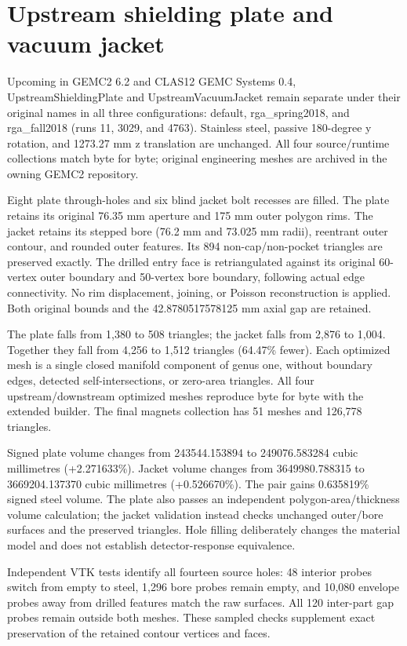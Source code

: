 \FloatBarrier
\section{Upstream shielding plate and vacuum jacket}
\label{sec:magnets-upstream}

Upcoming in GEMC2 6.2 and CLAS12 GEMC Systems 0.4, UpstreamShieldingPlate and UpstreamVacuumJacket remain
separate under their original names in all three configurations: default, rga\_spring2018, and rga\_fall2018
(runs 11, 3029, and 4763). Stainless steel, passive 180-degree y rotation, and 1273.27 mm z translation are
unchanged. All four source/runtime collections match byte for byte; original engineering meshes are archived
in the owning GEMC2 repository.

Eight plate through-holes and six blind jacket bolt recesses are filled. The plate retains its original 76.35
mm aperture and 175 mm outer polygon rims. The jacket retains its stepped bore (76.2 mm and 73.025 mm radii),
reentrant outer contour, and rounded outer features. Its 894 non-cap/non-pocket triangles are preserved
exactly. The drilled entry face is retriangulated against its original 60-vertex outer boundary and 50-vertex
bore boundary, following actual edge connectivity. No rim displacement, joining, or Poisson reconstruction is
applied. Both original bounds and the 42.8780517578125 mm axial gap are retained.

The plate falls from 1,380 to 508 triangles; the jacket falls from 2,876 to 1,004. Together they fall from
4,256 to 1,512 triangles (64.47\% fewer). Each optimized mesh is a single closed manifold component of genus
one, without boundary edges, detected self-intersections, or zero-area triangles. All four upstream/downstream
optimized meshes reproduce byte for byte with the extended builder. The final magnets collection has 51 meshes
and 126,778 triangles.

Signed plate volume changes from 243544.153894 to 249076.583284 cubic millimetres (+2.271633\%). Jacket volume
changes from 3649980.788315 to 3669204.137370 cubic millimetres (+0.526670\%). The pair gains 0.635819\%
signed steel volume. The plate also passes an independent polygon-area/thickness volume calculation; the
jacket validation instead checks unchanged outer/bore surfaces and the preserved triangles. Hole filling
deliberately changes the material model and does not establish detector-response equivalence.

Independent VTK tests identify all fourteen source holes: 48 interior probes switch from empty to steel, 1,296
bore probes remain empty, and 10,080 envelope probes away from drilled features match the raw surfaces. All
120 inter-part gap probes remain outside both meshes. These sampled checks supplement exact preservation of
the retained contour vertices and faces.

